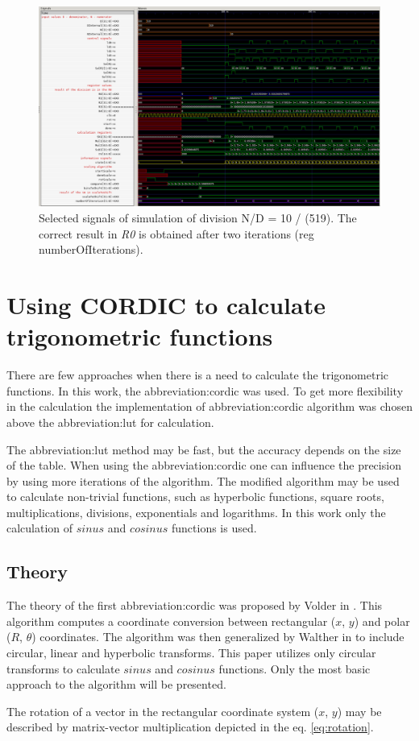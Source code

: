 \documentclass[a4paper, twoside, 11pt]{article}
\begin{document}
\begin{figure}[htbp!]
  \centering
  \includegraphics[width=1\textwidth]{src/png/division-10-div-519.png}
    \caption{Selected signals of simulation of division N/D = 10 / (519). The correct result in \textit{R0} is obtained after two iterations (reg numberOfIterations).}
  \label{fig:division-10-div-519}
\end{figure}

\section{Using CORDIC to calculate trigonometric functions}
    There are few approaches when there is a need to calculate the trigonometric functions. In this work, the \gls{abbreviation:cordic} was used. To get more flexibility in the calculation the implementation of \gls{abbreviation:cordic} algorithm was chosen above the \gls{abbreviation:lut} for calculation.\par
    The \gls{abbreviation:lut} method may be fast, but the accuracy depends on the size of the table. When using the \gls{abbreviation:cordic} one can influence the precision by using more iterations of the algorithm. The modified algorithm may be used to calculate non-trivial functions, such as hyperbolic functions, square roots, multiplications, divisions, exponentials and logarithms. \cite{base-digital-signal-processing-with-field-programmable-gate-arrays} In this work only the calculation of $sinus$ and $cosinus$ functions is used.
    \subsection{Theory}
        The theory of the first \gls{abbreviation:cordic} was proposed by Volder in \cite{volder-cordic-trigonomtric-computing-technique}. This algorithm computes a coordinate conversion between rectangular ($x$, $y$) and polar ($R$, $\theta$) coordinates. The algorithm was then generalized by Walther in \cite{walther-a-unified-algorithm-for-elementary-functions} to include circular, linear and hyperbolic transforms. This paper utilizes only circular transforms to calculate $sinus$ and $cosinus$ functions. Only the most basic approach to the algorithm will be presented.\par
        The rotation of a vector in the rectangular coordinate system ($x$, $y$) may be described by matrix-vector multiplication depicted in the eq. \ref{eq:rotation}.
\end{document}

